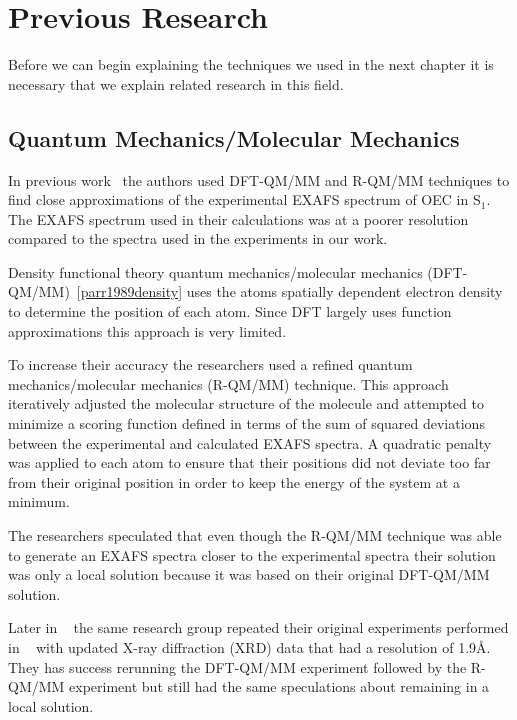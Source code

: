 \chapter{Previous Research}

Before we can begin explaining the techniques we used in the next chapter it is necessary that we explain related research in this field.

\section{Quantum Mechanics/Molecular Mechanics}

In previous work~\cite{sproviero2008model} the authors used DFT-QM/MM and R-QM/MM techniques to find close approximations of the experimental EXAFS spectrum of OEC in S$_{1}$. The EXAFS spectrum used in their calculations was at a poorer resolution compared to the spectra used in the experiments in our work.

Density functional theory quantum mechanics/molecular mechanics (DFT-QM/MM)~\ref{parr1989density} uses the atoms spatially dependent electron density to determine the position of each atom. Since DFT largely uses function approximations this approach is very limited.

To increase their accuracy the researchers used a refined quantum mechanics/molecular mechanics (R-QM/MM) technique. This approach iteratively adjusted the molecular structure of the molecule and attempted to minimize a scoring function defined in terms of the sum of squared deviations between the experimental and calculated EXAFS spectra. A quadratic penalty was applied to each atom to ensure that their positions did not deviate too far from their original position in order to keep the energy of the system at a minimum.

The researchers speculated that even though the R-QM/MM technique was able to generate an EXAFS spectra closer to the experimental spectra their solution was only a local solution because it was based on their original DFT-QM/MM solution.

Later in ~\cite{luber2011s1} the same research group repeated their original experiments performed in ~\cite{sproviero2008model} with updated X-ray diffraction (XRD) data that had a resolution of 1.9\AA. They has success rerunning the DFT-QM/MM experiment followed by the R-QM/MM experiment but still had the same speculations about remaining in a local solution.
